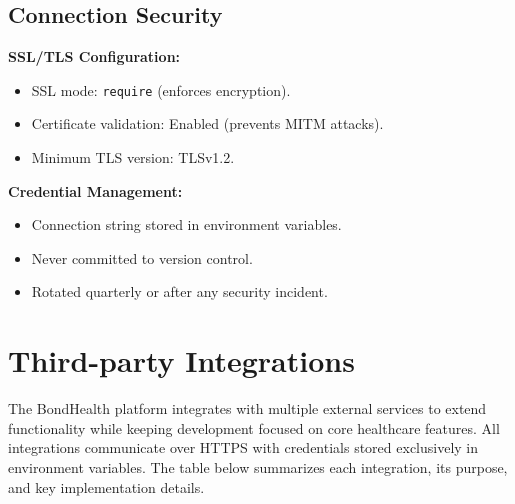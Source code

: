 \subsection{Connection Security}

\textbf{SSL/TLS Configuration:}
\begin{itemize}
    \item SSL mode: \texttt{require} (enforces encryption).
    \item Certificate validation: Enabled (prevents MITM attacks).
    \item Minimum TLS version: TLSv1.2.
\end{itemize}

\textbf{Credential Management:}
\begin{itemize}
    \item Connection string stored in environment variables.
    \item Never committed to version control.
    \item Rotated quarterly or after any security incident.
\end{itemize}


\section{Third-party Integrations}

\justifying
The BondHealth platform integrates with multiple external services to extend functionality
while keeping development focused on core healthcare features. All integrations communicate
over HTTPS with credentials stored exclusively in environment variables. The table below
summarizes each integration, its purpose, and key implementation details.


